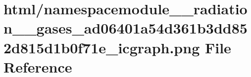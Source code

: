 \hypertarget{namespacemodule____radiation____gases__ad06401a54d361b3dd852d815d1b0f71e__icgraph_8png}{}\section{html/namespacemodule\+\_\+\+\_\+radiation\+\_\+\+\_\+gases\+\_\+ad06401a54d361b3dd852d815d1b0f71e\+\_\+icgraph.png File Reference}
\label{namespacemodule____radiation____gases__ad06401a54d361b3dd852d815d1b0f71e__icgraph_8png}
